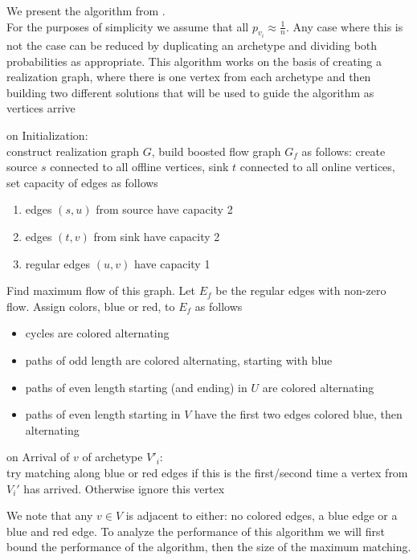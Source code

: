 We present the algorithm from \cite{obmStochastic}.\\
For the purposes of simplicity we assume that all $p_{v_i}\approx\frac{1}{n}$. Any case where this is not the case can be reduced by duplicating an archetype and dividing both probabilities as appropriate.
This algorithm works on the basis of creating a realization graph, where there is one vertex from each archetype and then building two different solutions that will be used to guide the algorithm as vertices arrive

\begin{algorithm}
	\caption{TSM}
\begin{algorithmic}
	\item on Initialization:\\
	construct realization graph $G$, build boosted flow graph $G_f$ as follows: create source $s$ connected to all offline vertices, sink $t$ connected to all online vertices, set capacity of edges as follows
	\begin{enumerate}
		\item edges $(s,u)$ from source have capacity 2
		\item edges $(t,v)$ from sink have capacity 2
		\item regular edges $(u,v)$ have capacity 1
	\end{enumerate}
	Find maximum flow of this graph. Let $E_f$ be the regular edges with non-zero flow. Assign colors, blue or red, to $E_f$ as follows
	\begin{itemize}
		\item cycles are colored alternating
		\item paths of odd length are colored alternating, starting with blue
		\item paths of even length starting (and ending) in $U$ are colored alternating
		\item paths of even length starting in $V$ have the first two edges colored blue, then alternating
	\end{itemize}
	\item on Arrival of $v$ of archetype $V'_i$:\\
	try matching along blue or red edges if this is the first/second time a vertex from $V_i'$ has arrived. Otherwise ignore this vertex
\end{algorithmic}
\end{algorithm}
We note that any $v\in V$ is adjacent to either: no colored edges, a blue edge or a blue and red edge.
To analyze the performance of this algorithm we will first bound the performance of the algorithm, then the size of the maximum matching.
